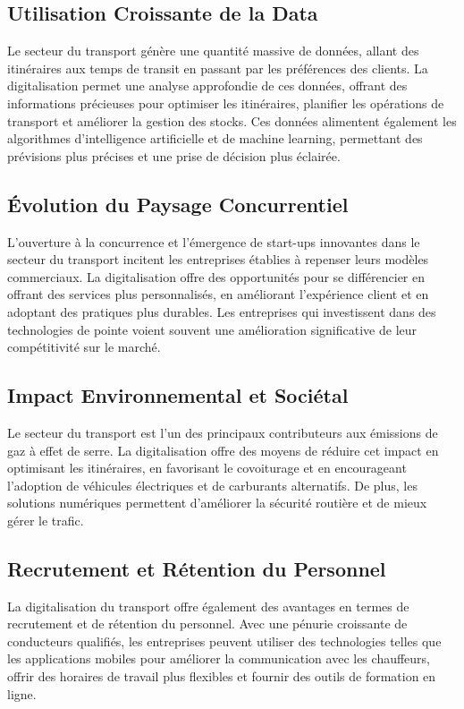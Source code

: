 \subsection{Utilisation Croissante de la Data}

Le secteur du transport génère une quantité massive de données, allant des itinéraires aux temps de transit en passant par les préférences des clients. La digitalisation permet une analyse approfondie de ces données, offrant des informations précieuses pour optimiser les itinéraires, planifier les opérations de transport et améliorer la gestion des stocks. Ces données alimentent également les algorithmes d'intelligence artificielle et de machine learning, permettant des prévisions plus précises et une prise de décision plus éclairée.

\subsection{Évolution du Paysage Concurrentiel}

L'ouverture à la concurrence et l'émergence de start-ups innovantes dans le secteur du transport incitent les entreprises établies à repenser leurs modèles commerciaux. La digitalisation offre des opportunités pour se différencier en offrant des services plus personnalisés, en améliorant l'expérience client et en adoptant des pratiques plus durables. Les entreprises qui investissent dans des technologies de pointe voient souvent une amélioration significative de leur compétitivité sur le marché.

\subsection{Impact Environnemental et Sociétal}

Le secteur du transport est l'un des principaux contributeurs aux émissions de gaz à effet de serre. La digitalisation offre des moyens de réduire cet impact en optimisant les itinéraires, en favorisant le covoiturage et en encourageant l'adoption de véhicules électriques et de carburants alternatifs. De plus, les solutions numériques permettent d'améliorer la sécurité routière et de mieux gérer le trafic.

\subsection{Recrutement et Rétention du Personnel}

La digitalisation du transport offre également des avantages en termes de recrutement et de rétention du personnel. Avec une pénurie croissante de conducteurs qualifiés, les entreprises peuvent utiliser des technologies telles que les applications mobiles pour améliorer la communication avec les chauffeurs, offrir des horaires de travail plus flexibles et fournir des outils de formation en ligne.


